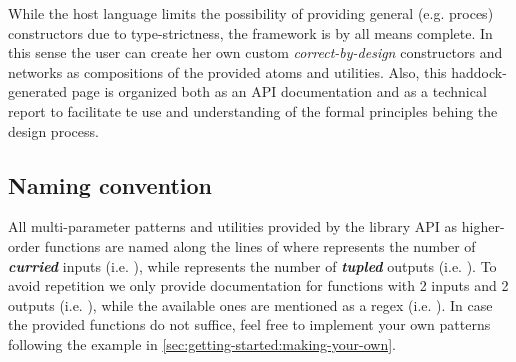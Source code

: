 While the host language limits the possibility of providing general
(e.g. proces) constructors due to type-strictness, the
 framework is by all means complete. In this sense the
user can create her own custom \emph{correct-by-design} constructors and
networks as compositions of the provided atoms and utilities. Also,
this haddock-generated page is organized both as an API
documentation and as a technical report to facilitate te use and
understanding of the formal principles behing the design process.\par

\subsection{Naming convention}
\label{sec:forsyde-atom:naming-convention}

All multi-parameter patterns and
utilities provided by the library API as higher-order functions are
named along the lines of  where  represents the
number of \textbf{\emph{curried}} inputs (i.e. ),
while  represents the number of \textbf{\emph{tupled}} outputs
(i.e. ). To avoid repetition we only provide
documentation for functions with 2 inputs and 2 outputs
(i.e. ), while the available ones are mentioned as a 
regex (i.e. ). In case the provided functions do not suffice,
feel free to implement your own patterns following the example in \cref{sec:getting-started:making-your-own}.\par
